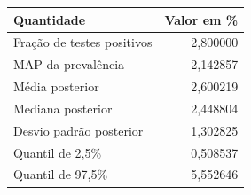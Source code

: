 \begin{tabular}{lr}
\toprule
Quantidade & Valor em \% \\
\midrule
Fração de testes positivos & 2,800000 \\
MAP da prevalência & 2,142857 \\
Média posterior & 2,600219 \\
Mediana posterior & 2,448804 \\
Desvio padrão posterior & 1,302825 \\
Quantil de 2,5\% & 0,508537 \\
Quantil de 97,5\% & 5,552646 \\
\bottomrule
\end{tabular}
